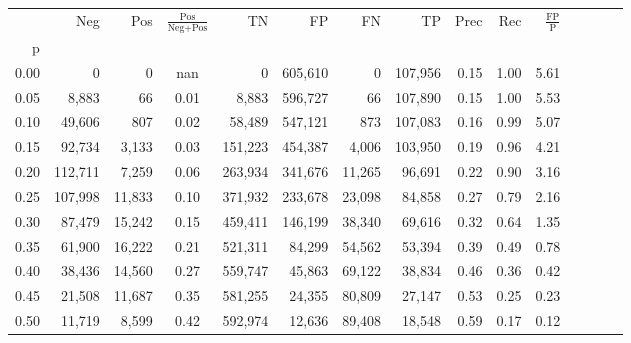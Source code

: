 \begin{tabular}{rrrcrrrrrrrrrrr}
\toprule
{} &      Neg &     Pos & $\frac{\text{Pos}}{\text{Neg}+\text{Pos}}$ &       TN &       FP &       FN &       TP &  Prec &   Rec & $\frac{\text{FP}}{\text{P}}$ \\
p    &          &         &                                            &          &          &          &          &       &       &                              \\
\midrule
0.00 &        0 &       0 &                                        nan &        0 &  605,610 &        0 &  107,956 &  0.15 &  1.00 &                         5.61 \\
0.05 &    8,883 &      66 &                                       0.01 &    8,883 &  596,727 &       66 &  107,890 &  0.15 &  1.00 &                         5.53 \\
0.10 &   49,606 &     807 &                                       0.02 &   58,489 &  547,121 &      873 &  107,083 &  0.16 &  0.99 &                         5.07 \\
0.15 &   92,734 &   3,133 &                                       0.03 &  151,223 &  454,387 &    4,006 &  103,950 &  0.19 &  0.96 &                         4.21 \\
0.20 &  112,711 &   7,259 &                                       0.06 &  263,934 &  341,676 &   11,265 &   96,691 &  0.22 &  0.90 &                         3.16 \\
0.25 &  107,998 &  11,833 &                                       0.10 &  371,932 &  233,678 &   23,098 &   84,858 &  0.27 &  0.79 &                         2.16 \\
0.30 &   87,479 &  15,242 &                                       0.15 &  459,411 &  146,199 &   38,340 &   69,616 &  0.32 &  0.64 &                         1.35 \\
0.35 &   61,900 &  16,222 &                                       0.21 &  521,311 &   84,299 &   54,562 &   53,394 &  0.39 &  0.49 &                         0.78 \\
0.40 &   38,436 &  14,560 &                                       0.27 &  559,747 &   45,863 &   69,122 &   38,834 &  0.46 &  0.36 &                         0.42 \\
0.45 &   21,508 &  11,687 &                                       0.35 &  581,255 &   24,355 &   80,809 &   27,147 &  0.53 &  0.25 &                         0.23 \\
0.50 &   11,719 &   8,599 &                                       0.42 &  592,974 &   12,636 &   89,408 &   18,548 &  0.59 &  0.17 &                         0.12 \\

\end{tabular}
